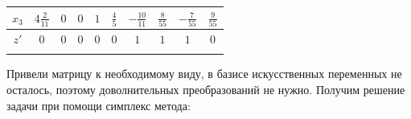 \documentclass[a4paper,14pt]{extarticle}
\begin{document}
\begin{center}
\begin{tabular}{|c|c|c|c|c|c|c|c|c|c|}
        \hline
        $x_3$            & $4\frac{2}{11}$   & $0$              & $0$              & $1$              & $\frac{4}{5}$    & $-\frac{10}{11}$  & $\frac{8}{55}$  & $-\frac{7}{55}$ & $\frac{9}{55}$  \\
        \hline
        $z'$             & $0$               & $0$              & $0$              & $0$              & $0$              & $1$               & $1$             & $1$             & $0$             \\
        \hline
        \multicolumn{10}{c}{}                                                                                                                                                                      \\
    \end{tabular}
\end{center}

Привели матрицу к необходимому виду, в базисе искусственных переменных не осталось, поэтому доволнительных преобразований не нужно.
Получим решение задачи при помощи симплекс метода:
\end{document}
